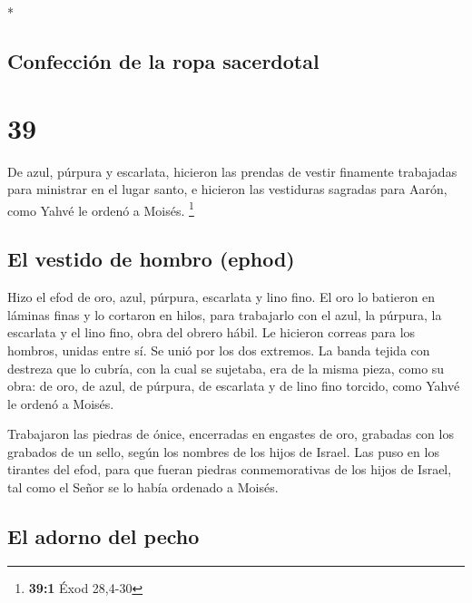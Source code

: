 \begin{paracol}{2}
\begin{otherlanguage}{english}
\end{otherlanguage}

\switchcolumn[0]*

\hypertarget{confecciuxf3n-de-la-ropa-sacerdotal}{%
\subsection{Confección de la ropa
sacerdotal}\label{confecciuxf3n-de-la-ropa-sacerdotal}}

\hypertarget{section-76}{%
\section{39}\label{section-76}}

 De azul, púrpura y escarlata, hicieron las prendas de
vestir finamente trabajadas para ministrar en el lugar santo, e hicieron
las vestiduras sagradas para Aarón, como Yahvé le ordenó a Moisés.
\footnote{\textbf{39:1} Éxod 28,4-30}

\hypertarget{el-vestido-de-hombro-ephod-1}{%
\subsection{El vestido de hombro
(ephod)}\label{el-vestido-de-hombro-ephod-1}}

 Hizo el efod de oro, azul, púrpura, escarlata y lino
fino.  El oro lo batieron en láminas finas y lo cortaron
en hilos, para trabajarlo con el azul, la púrpura, la escarlata y el
lino fino, obra del obrero hábil.  Le hicieron correas
para los hombros, unidas entre sí. Se unió por los dos extremos.
 La banda tejida con destreza que lo cubría, con la cual
se sujetaba, era de la misma pieza, como su obra: de oro, de azul, de
púrpura, de escarlata y de lino fino torcido, como Yahvé le ordenó a
Moisés.

 Trabajaron las piedras de ónice, encerradas en engastes
de oro, grabadas con los grabados de un sello, según los nombres de los
hijos de Israel.  Las puso en los tirantes del efod, para
que fueran piedras conmemorativas de los hijos de Israel, tal como el
Señor se lo había ordenado a Moisés.

\hypertarget{el-adorno-del-pecho}{%
\subsection{El adorno del pecho}\label{el-adorno-del-pecho}}


\end{paracol}
